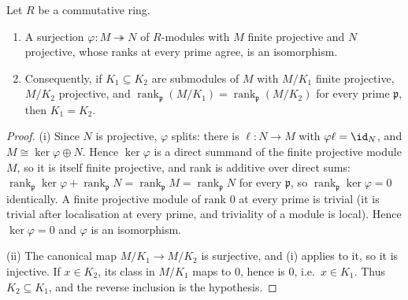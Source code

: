\begin{lemma}
  \label{lem:rankAtStalk_equal_quotients}
  \leanok
  Let \(R\) be a commutative ring.
  \begin{enumerate}
    \item A surjection \(\varphi \colon M \twoheadrightarrow N\) of \(R\)-modules with \(M\)
      finite projective and \(N\) projective, whose ranks at every prime agree, is an
      isomorphism.
    \item Consequently, if \(K_1 \subseteq K_2\) are submodules of \(M\) with \(M/K_1\)
      finite projective, \(M/K_2\) projective, and
      \(\operatorname{rank}_{\mathfrak p}(M/K_1) = \operatorname{rank}_{\mathfrak p}(M/K_2)\)
      for every prime \(\mathfrak p\), then \(K_1 = K_2\).
  \end{enumerate}
\end{lemma}
\begin{proof}
  \leanok
  (i) Since \(N\) is projective, \(\varphi\) splits: there is \(\ell \colon N \to M\) with
  \(\varphi \ell = \id_N\), and \(M \cong \ker\varphi \oplus N\). Hence \(\ker \varphi\) is
  a direct summand of the finite projective module \(M\), so it is itself finite
  projective, and rank is additive over direct sums:
  \(\operatorname{rank}_{\mathfrak p} \ker\varphi + \operatorname{rank}_{\mathfrak p} N =
  \operatorname{rank}_{\mathfrak p} M = \operatorname{rank}_{\mathfrak p} N\) for every
  \(\mathfrak p\), so \(\operatorname{rank}_{\mathfrak p}\ker\varphi = 0\) identically. A
  finite projective module of rank \(0\) at every prime is trivial (it is trivial after
  localisation at every prime, and triviality of a module is local). Hence
  \(\ker \varphi = 0\) and \(\varphi\) is an isomorphism.

  (ii) The canonical map \(M/K_1 \to M/K_2\) is surjective, and (i) applies to it, so it is
  injective. If \(x \in K_2\), its class in \(M/K_1\) maps to \(0\), hence is \(0\), i.e.\
  \(x \in K_1\). Thus \(K_2 \subseteq K_1\), and the reverse inclusion is the hypothesis.
\end{proof}

